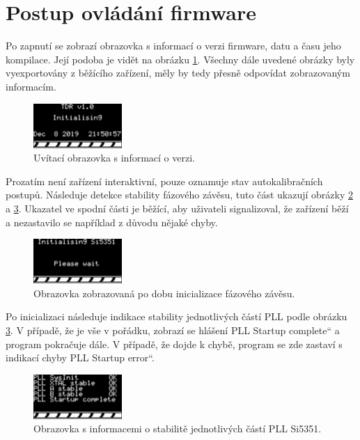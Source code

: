 \section{Postup ovládání firmware}
Po zapnutí se zobrazí obrazovka s informací o verzi firmware, datu a času jeho kompilace. Její podoba je vidět na obrázku \ref{greeting_screen}. Všechny dále uvedené obrázky byly vyexportovány z běžícího zařízení, měly by tedy přesně odpovídat zobrazovaným informacím.
\begin{figure}[H]
\includegraphics[width=0.3\textwidth,keepaspectratio]{images/greeting_screen.png}\caption{Uvítací obrazovka s informací o verzi.}\label{greeting_screen}
\end{figure}

Prozatím není zařízení interaktivní, pouze oznamuje stav autokalibračních postupů. Následuje detekce stability fázového závěsu, tuto část ukazují obrázky \ref{init_5351} a \ref{stability_5351}. Ukazatel ve spodní části je běžící, aby uživateli signalizoval, že zařízení běží a nezastavilo se například z důvodu nějaké chyby.
\begin{figure}[H]
\includegraphics[width=0.3\textwidth,keepaspectratio,interpolate=false]{images/init_5351.png}\caption{Obrazovka zobrazovaná po dobu inicializace fázového závěsu.}\label{init_5351}
\end{figure}

Po inicializaci následuje indikace stability jednotlivých částí PLL podle obrázku \ref{stability_5351}. V případě, že je vše v pořádku, zobrazí se hlášení \quotedblbase PLL Startup complete\textquotedblleft{} a program pokračuje dále. V případě, že dojde k chybě, program se zde zastaví s indikací chyby \quotedblbase PLL Startup error\textquotedblleft. 
\begin{figure}[H]
\includegraphics[width=0.3\textwidth,keepaspectratio,interpolate=false]{images/stability_5351.png}\caption{Obrazovka s informacemi o stabilitě jednotlivých částí PLL Si5351.}\label{stability_5351}
\end{figure}

